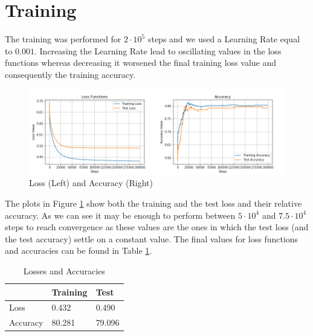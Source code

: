 \documentclass[10pt,a4paper]{report}
\begin{document}
\section{Training}
The training was performed for $2 \cdot 10^5$ steps and we used a Learning Rate equal to $0.001$. Increasing the Learning Rate lead to oscillating values in the loss functions whereas decreasing it worsened the final training loss value and consequently the training accuracy. 
\begin{figure}[!ht]
\centering
\includegraphics[width=\linewidth]{loss_acc.png}
\caption{Loss (Left) and Accuracy (Right)}
\label{fig:loss_acc}
\end{figure}
The plots in Figure \ref{fig:loss_acc} show both the training and the test loss and their relative accuracy. As we can see it may be enough to perform between $5 \cdot 10^4$ and $7.5 \cdot 10^4$ steps to reach convergence as these values are the ones in which the test loss (and the test accuracy) settle on a constant value. The final values for loss functions and accuracies can be found in Table \ref{tab:loss_acc}.
\begin{table}[!ht]
\centering
\begin{tabular}{|l|l|l|}
\hline
         & Training & Test   \\ \hline
Loss     & 0.432    & 0.490  \\ \hline
Accuracy & 80.281   & 79.096 \\ \hline
\end{tabular}
\caption{Losses and Accuracies}
\label{tab:loss_acc}
\end{table}
\end{document}
